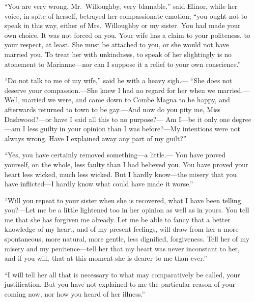 ``You are very wrong, Mr.\ Willoughby, very blamable,''
said Elinor, while her voice, in spite of herself,
betrayed her compassionate emotion; ``you ought not to speak
in this way, either of Mrs.\ Willoughby or my sister.
You had made your own choice.  It was not forced on you.
Your wife has a claim to your politeness, to your respect,
at least.  She must be attached to you, or she would not
have married you.  To treat her with unkindness, to speak
of her slightingly is no atonement to Marianne---nor can I
suppose it a relief to your own conscience.''

``Do not talk to me of my wife,'' said he with a heavy sigh.---%
``She does not deserve your compassion.---She knew I had no
regard for her when we married.---Well, married we were,
and came down to Combe Magna to be happy, and afterwards
returned to town to be gay.---And now do you pity me,
Miss Dashwood?---or have I said all this to no purpose?---%
Am I---be it only one degree---am I less guilty in your opinion
than I was before?---My intentions were not always wrong.
Have I explained away any part of my guilt?''

``Yes, you have certainly removed something---a little.---%
You have proved yourself, on the whole, less faulty than
I had believed you.  You have proved your heart less wicked,
much less wicked.  But I hardly know---the misery that
you have inflicted---I hardly know what could have made
it worse.''

``Will you repeat to your sister when she is recovered,
what I have been telling you?---Let me be a little lightened
too in her opinion as well as in yours.  You tell me that
she has forgiven me already.  Let me be able to fancy that
a better knowledge of my heart, and of my present feelings,
will draw from her a more spontaneous, more natural, more
gentle, less dignified, forgiveness.  Tell her of my misery
and my penitence---tell her that my heart was never inconstant
to her, and if you will, that at this moment she is dearer
to me than ever.''

``I will tell her all that is necessary to what may
comparatively be called, your justification.  But you have
not explained to me the particular reason of your coming now,
nor how you heard of her illness.''

